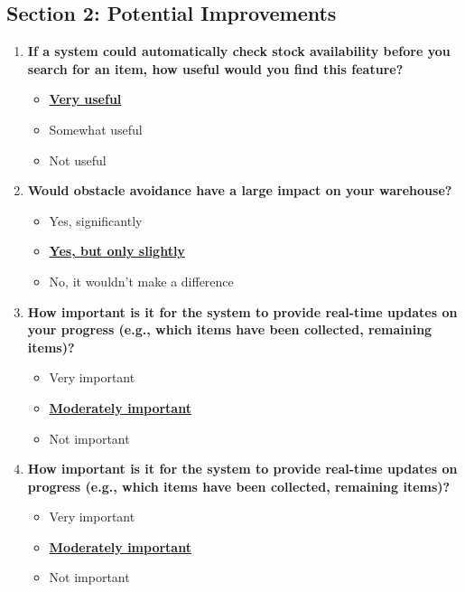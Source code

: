 \subsection*{Section 2: Potential Improvements}

\begin{enumerate}
    \item \textbf{If a system could automatically check stock availability before you search for an item, how useful would you find this feature?}
    \begin{itemize}
        \item \textbf{\underline{Very useful}}
        \item Somewhat useful
        \item Not useful
    \end{itemize}
\newpage
    \item \textbf{Would obstacle avoidance have a large impact on your warehouse?}
    \begin{itemize}
        \item Yes, significantly
        \item \textbf{\underline{Yes, but only slightly}}
        \item No, it wouldn’t make a difference
    \end{itemize}

    \item \textbf{How important is it for the system to provide real-time updates on your progress (e.g., which items have been collected, remaining items)?}
    \begin{itemize}
        \item Very important
        \item \textbf{\underline{Moderately important}}
        \item Not important
    \end{itemize}

    \item \textbf{How important is it for the system to provide real-time updates on progress (e.g., which items have been collected, remaining items)?}
    \begin{itemize}
        \item Very important
        \item \textbf{\underline{Moderately important}}
        \item Not important
    \end{itemize}

\end{enumerate}

